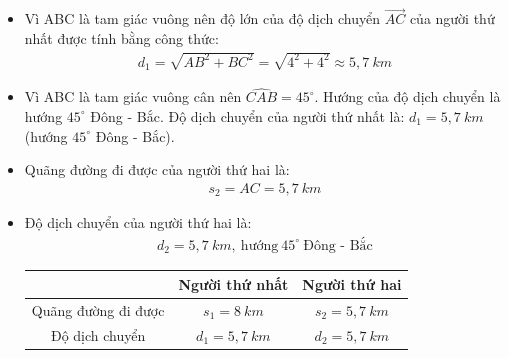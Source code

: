 \begin{vidu}
{\begin{itemize}
\begin{align*}
\end{align*}
\item Vì ABC là tam giác vuông nên độ lớn của độ dịch chuyển $\vec{AC}$ của người thứ nhất được tính bằng công thức: 
\begin{align*}
d_1=\sqrt{AB^2+BC^2}=\sqrt{4^2+4^2}\approx 5,7\ km
\end{align*}
\item Vì ABC là tam giác vuông cân nên $\widehat{CAB}=45^\circ$. Hướng của độ dịch chuyển là hướng $45^\circ$ Đông - Bắc. Độ dịch chuyển của người thứ nhất là: $d_1=5,7\ km$ (hướng $45^\circ$ Đông - Bắc).
\item Quãng đường đi được của người thứ hai là:
\begin{align*}
s_2=AC=5,7\ km
\end{align*}
\item Độ dịch chuyển của người thứ hai là:
\begin{align*}
d_2=5,7\ km,\ \text{hướng}\ 45^\circ\ \text{Đông - Bắc} 
\end{align*}
\begin{center}
\begin{tabular}{|c|c|c|}
\hline 
&  Người thứ nhất&Người thứ hai  \\ 
\hline 
Quãng đường đi được&$s_1=8\ km$  &$s_2=5,7\ km$  \\ 
\hline 
Độ dịch chuyển&$d_1=5,7\ km$  &$d_2=5,7\ km$  \\ 
\hline 
\end{tabular} 
\end{center}
\end{itemize}
}
\end{vidu}
\begin{vidu}
\end{vidu}



